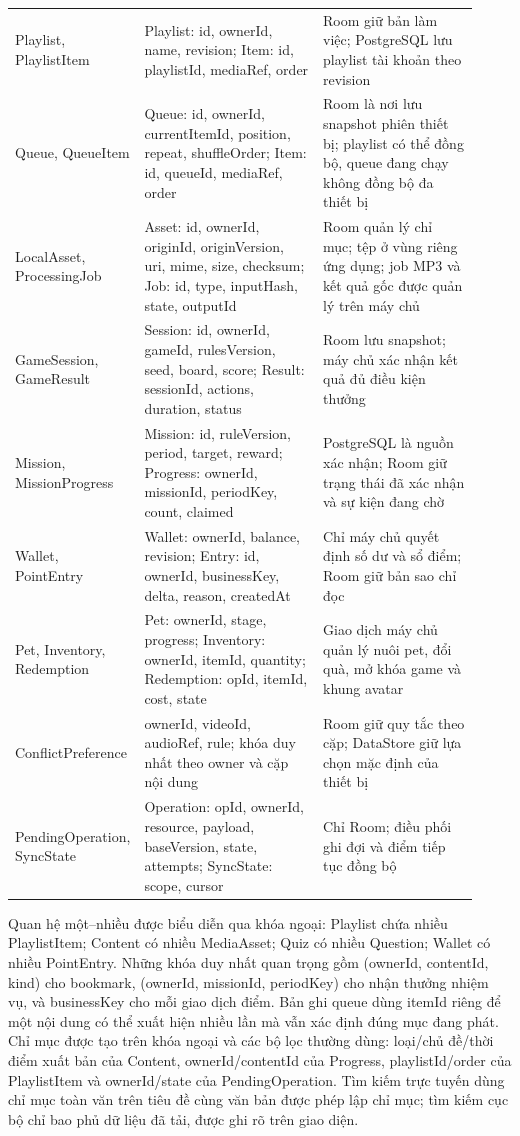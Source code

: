 \begin{longtable}{>{\RaggedRight\arraybackslash}p{0.19\linewidth}>{\RaggedRight\arraybackslash}p{0.39\linewidth}>{\RaggedRight\arraybackslash}p{0.34\linewidth}}
Playlist, PlaylistItem & Playlist: id, ownerId, name, revision; Item: id, playlistId, mediaRef, order & Room giữ bản làm việc; PostgreSQL lưu playlist tài khoản theo revision \\
Queue, QueueItem & Queue: id, ownerId, currentItemId, position, repeat, shuffleOrder; Item: id, queueId, mediaRef, order & Room là nơi lưu snapshot phiên thiết bị; playlist có thể đồng bộ, queue đang chạy không đồng bộ đa thiết bị \\
LocalAsset, ProcessingJob & Asset: id, ownerId, originId, originVersion, uri, mime, size, checksum; Job: id, type, inputHash, state, outputId & Room quản lý chỉ mục; tệp ở vùng riêng ứng dụng; job MP3 và kết quả gốc được quản lý trên máy chủ \\
GameSession, GameResult & Session: id, ownerId, gameId, rulesVersion, seed, board, score; Result: sessionId, actions, duration, status & Room lưu snapshot; máy chủ xác nhận kết quả đủ điều kiện thưởng \\
Mission, MissionProgress & Mission: id, ruleVersion, period, target, reward; Progress: ownerId, missionId, periodKey, count, claimed & PostgreSQL là nguồn xác nhận; Room giữ trạng thái đã xác nhận và sự kiện đang chờ \\
Wallet, PointEntry & Wallet: ownerId, balance, revision; Entry: id, ownerId, businessKey, delta, reason, createdAt & Chỉ máy chủ quyết định số dư và sổ điểm; Room giữ bản sao chỉ đọc \\
Pet, Inventory, Redemption & Pet: ownerId, stage, progress; Inventory: ownerId, itemId, quantity; Redemption: opId, itemId, cost, state & Giao dịch máy chủ quản lý nuôi pet, đổi quà, mở khóa game và khung avatar \\*
ConflictPreference & ownerId, videoId, audioRef, rule; khóa duy nhất theo owner và cặp nội dung & Room giữ quy tắc theo cặp; DataStore giữ lựa chọn mặc định của thiết bị \\*
PendingOperation, SyncState & Operation: opId, ownerId, resource, payload, baseVersion, state, attempts; SyncState: scope, cursor & Chỉ Room; điều phối ghi đợi và điểm tiếp tục đồng bộ \\
\end{longtable}
\endgroup

Quan hệ một--nhiều được biểu diễn qua khóa ngoại: Playlist chứa nhiều PlaylistItem; Content có nhiều MediaAsset; Quiz có nhiều Question; Wallet có nhiều PointEntry. Những khóa duy nhất quan trọng gồm (ownerId, contentId, kind) cho bookmark, (ownerId, missionId, periodKey) cho nhận thưởng nhiệm vụ, và businessKey cho mỗi giao dịch điểm. Bản ghi queue dùng itemId riêng để một nội dung có thể xuất hiện nhiều lần mà vẫn xác định đúng mục đang phát. Chỉ mục được tạo trên khóa ngoại và các bộ lọc thường dùng: loại/chủ đề/thời điểm xuất bản của Content, ownerId/contentId của Progress, playlistId/order của PlaylistItem và ownerId/state của PendingOperation. Tìm kiếm trực tuyến dùng chỉ mục toàn văn trên tiêu đề cùng văn bản được phép lập chỉ mục; tìm kiếm cục bộ chỉ bao phủ dữ liệu đã tải, được ghi rõ trên giao diện.

